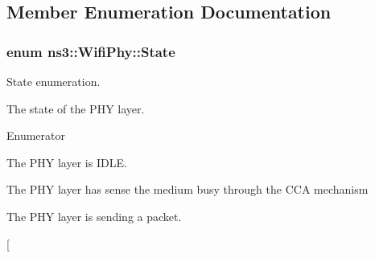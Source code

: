 \subsection{Member Enumeration Documentation}
\subsubsection[{\texorpdfstring{State}{State}}]{\setlength{\rightskip}{0pt plus 5cm}enum {\bf ns3\+::\+Wifi\+Phy\+::\+State}}\hypertarget{classns3_1_1WifiPhy_af97408fa76f99797497b492758467143}{}\label{classns3_1_1WifiPhy_af97408fa76f99797497b492758467143}


State enumeration. 

The state of the P\+HY layer. \begin{Desc}
\item[Enumerator]\par
\begin{description}
\item[{\em 
I\+D\+LE\hypertarget{classns3_1_1WifiPhy_af97408fa76f99797497b492758467143ab82b721cfd612ae187d78ffc812c567d}{}\label{classns3_1_1WifiPhy_af97408fa76f99797497b492758467143ab82b721cfd612ae187d78ffc812c567d}
}]The P\+HY layer is I\+D\+LE. \item[{\em 
C\+C\+A\+\_\+\+B\+U\+SY\hypertarget{classns3_1_1WifiPhy_af97408fa76f99797497b492758467143aaec7a6711c1e391040d923fc0efcc849}{}\label{classns3_1_1WifiPhy_af97408fa76f99797497b492758467143aaec7a6711c1e391040d923fc0efcc849}
}]The P\+HY layer has sense the medium busy through the C\+CA mechanism \item[{\em 
TX\hypertarget{classns3_1_1WifiPhy_af97408fa76f99797497b492758467143a69db14ff4bed82ca0242f8b09065ff09}{}\label{classns3_1_1WifiPhy_af97408fa76f99797497b492758467143a69db14ff4bed82ca0242f8b09065ff09}
}]The P\+HY layer is sending a packet. \item[{\em 
}
\end{description}
\end{Desc}
